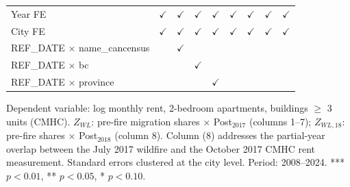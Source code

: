 \begin{table}[htbp]
\begin{tabular}{lcccccccc}
       \\
      Year FE                                & $\checkmark$  & $\checkmark$  & $\checkmark$  & $\checkmark$  & $\checkmark$  & $\checkmark$  & $\checkmark$  & $\checkmark$\\   
      City FE                                & $\checkmark$  & $\checkmark$  & $\checkmark$  & $\checkmark$  & $\checkmark$  & $\checkmark$  & $\checkmark$  & $\checkmark$\\   
      REF\_DATE $\times $ name\_cancensus    &               & $\checkmark$  &               &               &               &               &               & \\  
      REF\_DATE $\times $ bc                 &               &               & $\checkmark$  &               &               &               &               & \\  
      REF\_DATE $\times $ province           &               &               &               & $\checkmark$  &               &               &               & \\  
      \bottomrule
   \end{tabular}
   
   \par \raggedright 
   Dependent variable: log monthly rent, 2-bedroom apartments, buildings $\geq$ 3 units (CMHC). $Z_{WL}$: pre-fire migration shares $\times$ Post$_{2017}$ (columns 1--7); $Z_{WL,18}$: pre-fire shares $\times$ Post$_{2018}$ (column 8). Column (8) addresses the partial-year overlap between the July 2017 wildfire and the October 2017 CMHC rent measurement. Standard errors clustered at the city level. Period: 2008--2024. *** $p<0.01$, ** $p<0.05$, * $p<0.10$.
\end{table}
